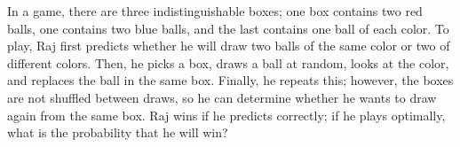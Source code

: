 In a game, there are three indistinguishable boxes; one box contains two red balls, one contains two blue balls, and the last contains one ball of each color. To play, Raj first predicts whether he will draw two balls of the same color or two of different colors. Then, he picks a box, draws a ball at random,
looks at the color, and replaces the ball in the same box. Finally, he repeats this; however, the boxes are not shuffled between draws, so he can determine whether he wants to draw again from the same box. Raj wins if he predicts correctly; if he plays optimally, what is the probability that he will win?